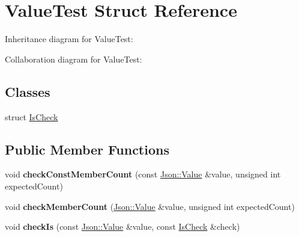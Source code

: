 \hypertarget{struct_value_test}{\section{Value\+Test Struct Reference}
\label{struct_value_test}
}


Inheritance diagram for Value\+Test\+:


Collaboration diagram for Value\+Test\+:
\subsection*{Classes}
\begin{DoxyCompactItemize}
\item 
struct \hyperlink{struct_value_test_1_1_is_check}{Is\+Check}
\end{DoxyCompactItemize}
\subsection*{Public Member Functions}
\begin{DoxyCompactItemize}
\item 
\hypertarget{struct_value_test_a54c5460d823bff7077558967733dd330}{void {\bfseries check\+Const\+Member\+Count} (const \hyperlink{class_json_1_1_value}{Json\+::\+Value} \&value, unsigned int expected\+Count)}\label{struct_value_test_a54c5460d823bff7077558967733dd330}

\item 
\hypertarget{struct_value_test_a6e74ea145ac705ecbfb41143a4167865}{void {\bfseries check\+Member\+Count} (\hyperlink{class_json_1_1_value}{Json\+::\+Value} \&value, unsigned int expected\+Count)}\label{struct_value_test_a6e74ea145ac705ecbfb41143a4167865}

\item 
\hypertarget{struct_value_test_a0f99def9d2e05a893f99e68dee0082cd}{void {\bfseries check\+Is} (const \hyperlink{class_json_1_1_value}{Json\+::\+Value} \&value, const \hyperlink{struct_value_test_1_1_is_check}{Is\+Check} \&check)}\label{struct_value_test_a0f99def9d2e05a893f99e68dee0082cd}

\end{DoxyCompactItemize}
